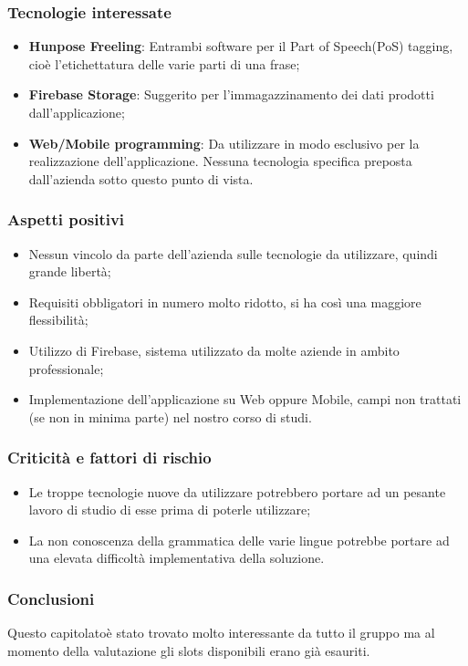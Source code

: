 \subsubsection{Tecnologie interessate}
\begin{itemize}
	\item \textbf{Hunpos\glosp e Freeling\glo}: Entrambi software per il Part of Speech(PoS) tagging, cioè l'etichettatura delle varie parti di una frase;
	\item \textbf{Firebase Storage\glo}: Suggerito per l'immagazzinamento dei dati prodotti dall'applicazione;
	\item \textbf{Web/Mobile programming}: Da utilizzare in modo esclusivo per la realizzazione dell'applicazione. Nessuna tecnologia specifica preposta dall'azienda sotto questo punto di vista.
\end{itemize}
\subsubsection{Aspetti positivi}
\begin{itemize}
	\item Nessun vincolo da parte dell'azienda sulle tecnologie da utilizzare, quindi grande libertà;
	\item Requisiti obbligatori in numero molto ridotto, si ha così una maggiore flessibilità;
	\item Utilizzo di Firebase\glo, sistema utilizzato da molte aziende in ambito professionale;
	\item Implementazione dell'applicazione su Web oppure Mobile, campi non trattati (se non in minima parte) nel nostro corso di studi. 
\end{itemize}
\subsubsection{Criticità e fattori di rischio}
\begin{itemize}
\item Le troppe tecnologie nuove da utilizzare potrebbero portare ad un pesante lavoro di studio di esse prima di poterle utilizzare;
\item La non conoscenza della grammatica delle varie lingue potrebbe portare ad una elevata difficoltà implementativa della soluzione.
\end{itemize}
\subsubsection{Conclusioni}
Questo capitolato\glosp è stato trovato molto interessante da tutto il gruppo ma al momento della valutazione gli slots disponibili erano già esauriti.